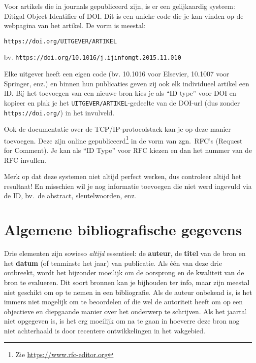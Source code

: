 Voor artikels die in journals gepubliceerd zijn, is er een gelijkaardig systeem: Ditigal Object Identifier of DOI. Dit is een unieke code die je kan vinden op de webpagina van het artikel. De vorm is meestal:

\begin{center}
  \texttt{https://doi.org/UITGEVER/ARTIKEL}

  bv. \texttt{https://doi.org/10.1016/j.ijinfomgt.2015.11.010}
\end{center}

Elke uitgever heeft een eigen code (bv. 10.1016 voor Elsevier, 10.1007 voor Springer, enz.) en binnen hun publicaties geven zij ook elk individueel artikel een ID. Bij het toevoegen van een nieuwe bron kies je als ``ID type'' voor DOI en kopieer en plak je het \texttt{UITGEVER/ARTIKEL}-gedeelte van de DOI-url (dus zonder \texttt{https://doi.org/}) in het invulveld.

Ook de documentatie over de TCP/IP-protocolstack kan je op deze manier toevoegen. Deze zijn online gepubliceerd\footnote{Zie \url{https://www.rfc-editor.org}} in de vorm van zgn.~RFC's (Request for Comment). Je kan als ``ID Type'' voor RFC kiezen en dan het nummer van de RFC invullen.

Merk op dat deze systemen niet altijd perfect werken, dus controleer altijd het resultaat! En misschien wil je nog informatie toevoegen die niet werd ingevuld via de ID, bv.\ de abstract, sleutelwoorden, enz.


\section{Algemene bibliografische gegevens}%
\label{sec:algemene_bibliografische_gegevens}

 Drie elementen zijn sowieso \emph{altijd} essentieel: de \textbf{auteur}, de \textbf{titel} van de bron en het \textbf{datum} (of tenminste het jaar) van publicatie. Als één van deze drie ontbreekt, wordt het bijzonder moeilijk om de oorsprong en de kwaliteit van de bron te evalueren. Dit soort bronnen kan je bijhouden ter info, maar zijn meestal niet geschikt om op te nemen in een bibliografie. Als de auteur onbekend is, is het immers niet mogelijk om te beoordelen of die wel de autoriteit heeft om op een objectieve en diepgaande manier over het onderwerp te schrijven. Als het jaartal niet opgegeven is, is het erg moeilijk om na te gaan in hoeverre deze bron nog niet achterhaald is door recentere ontwikkelingen in het vakgebied.

